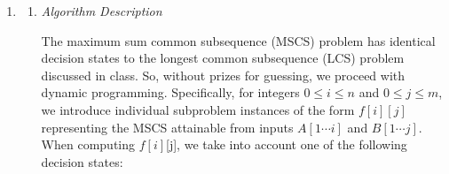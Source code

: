 \documentclass{article}
\begin{document}
\begin{enumerate}[leftmargin={*}, font={\bf}, label={\arabic*.}, ref={\arabic*}]
\begin{enumerate}
      \item \label{qst:2b}
        {\itshape Algorithm Pseudocode} \vspace{-\baselineskip}

        \begin{minipage}{\linewidth}
          \begin{algorithm}[H]
            \caption{$\textsc{Knapsack}(A, V, M)$}\label{alg:bounded-knapsack}
            \begin{algorithmic}[1]
                \State $f[i][0] \gets 0$ \textbf{for each} $i \in \{0 \cdots n\}$
                \State $f[0][j] \gets 0$ \textbf{for each} $j \in \{0 \cdots M\}$
                      \State $f[i][j] \gets f[i-1][j]$
                    \Else
                      \State $f[i][j] \gets \max\big\{f[i-1][j], f[i-1][j-A[i]] + V[i]\big\}$
                    \EndIf
                  \EndFor
                \EndFor
                \State \Return $f[n][M]$
            \end{algorithmic}
          \end{algorithm}
        \end{minipage}
    \end{enumerate}

  \newpage

  \item \label{qst:3}
    \begin{enumerate}
      \item \label{qst:3a}
        {\itshape Algorithm Description}
        
        The maximum sum common subsequence (MSCS) problem has identical decision states to the longest
        common subsequence (LCS) problem discussed in class. So, without prizes for guessing, we proceed
        with dynamic programming. Specifically, for integers $0 \leq i \leq n$ and $0 \leq j \leq m$, we
        introduce individual subproblem instances of the form $f[i][j]$ representing the MSCS attainable
        from inputs $A[1 \cdots i]$ and $B[1 \cdots j]$. When computing $f[i]$[j], we take into account
        one of the following decision states:


\end{enumerate}
\end{enumerate}
\end{document}
